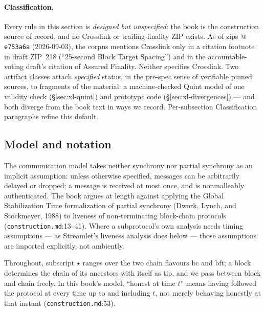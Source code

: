 \documentclass[11pt,a4paper]{article}
\theoremstyle{definition}
\begin{document}
\paragraph{Classification.} Every rule in this section is \emph{designed
but unspecified}: the book is the construction source of record, and no
Crosslink or trailing-finality ZIP exists. As of zips @
\texttt{e753a6a} (2026-09-03), the corpus mentions Crosslink only in a
citation footnote in draft ZIP~218 (``25-second Block Target Spacing'')
and in the accountable-voting draft's citation of Assured Finality.
Neither specifies Crosslink. Two artifact classes attach \emph{specified}
status, in the pre-spec sense of verifiable pinned sources, to fragments
of the material: a machine-checked Quint model of one validity check
(\S\ref{sec:xl-quint}) and prototype code (\S\ref{sec:xl-divergences}) ---
and both diverge from the book text in ways we record. Per-subsection
Classification paragraphs refine this default.

\subsection{Model and notation}\label{sec:xl-constr-model}

The communication model takes neither synchrony nor partial synchrony as
an implicit assumption: unless otherwise specified, messages can be
arbitrarily delayed or dropped; a message is received at most once, and is
nonmalleably authenticated. The book argues at length against applying the
Global Stabilization Time formalization of partial synchrony (Dwork,
Lynch, and Stockmeyer, 1988) to liveness of non-terminating block-chain
protocols (\texttt{construction.md}:13--41). Where a subprotocol's own
analysis needs timing assumptions --- as Streamlet's liveness analysis
does below --- those assumptions are imported explicitly, not ambiently.

Throughout, subscript $\star$ ranges over the two chain flavours
$\mathrm{bc}$ and $\mathrm{bft}$; a block determines the chain of its
ancestors with itself as tip, and we pass between block and chain freely.
In this book's model, ``honest at time $t$'' means having followed the
protocol at every time up to and including $t$, not merely behaving
honestly at that instant (\texttt{construction.md}:53).
\end{document}
